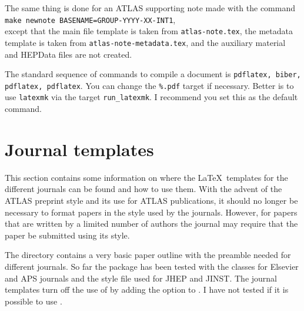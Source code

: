 The same thing is done for an ATLAS supporting note made with the command\\
\texttt{make newnote BASENAME=GROUP-YYYY-XX-INT1},\\
except that the main file template is taken from
\texttt{atlas-note.tex},
the metadata template is taken from \texttt{atlas-note-metadata.tex},
and the auxiliary material and HEPData files are not created.

The standard sequence of commands to compile a document is
\texttt{pdflatex, biber, pdflatex, pdflatex}.
You can change the \texttt{\%.pdf} target if necessary.
Better is to use \texttt{latexmk} via the target \texttt{run\_latexmk}.
I recommend you set this as the default command.

\section{Journal templates}
\label{sec:journal}

This section contains some information on where the \LaTeX\ templates for the different journals can be found and how to use them.
With the advent of the ATLAS preprint style and its use for ATLAS publications, 
it should no longer be necessary to format papers in the style used by the journals.
However, for papers that are written by a limited number of authors
the journal may require that the paper be submitted using its style.

The directory  contains a very basic paper outline with the preamble needed for different journals.
So far the  package has been tested with the classes for Elsevier and APS journals and the style file used for JHEP and JINST.
The journal templates turn off the use of 
by adding the option  to .
I have not tested if it is possible to use .


